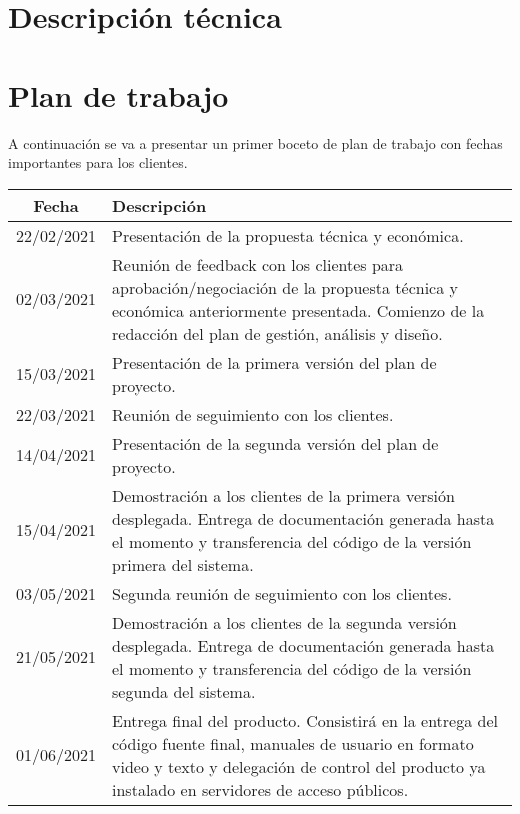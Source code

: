 \documentclass{article}
\begin{document}
\section{Descripción técnica}



\section{Plan de trabajo}
A continuación se va a presentar un primer boceto de plan de trabajo con fechas importantes para los clientes.

\begin{table}[H]
    \centering
    \begin{tabular}{| c | p{30em} |}
    \hline
        Fecha &  Descripción  \\ \hline
        22/02/2021 & Presentación de la propuesta técnica y económica.  \\ \hline
        02/03/2021 & Reunión de feedback con los clientes para aprobación/negociación de la propuesta técnica y económica anteriormente presentada. Comienzo de la redacción del plan de gestión, análisis y diseño. \\ \hline
        15/03/2021 & Presentación de la primera versión del plan de proyecto.\\ \hline
        22/03/2021 & Reunión de seguimiento con los clientes. \\ \hline
        14/04/2021 & Presentación de la segunda versión del plan de proyecto. \\ \hline
        15/04/2021 & Demostración a los clientes de la primera versión desplegada.
        Entrega de documentación generada hasta el momento y transferencia del código de la versión primera del sistema.\\ \hline
        03/05/2021 & Segunda reunión de seguimiento con los clientes. \\ \hline
        21/05/2021 & Demostración a los clientes de la segunda versión desplegada.
        Entrega de documentación generada hasta el momento y transferencia del código de la versión segunda del sistema.\\ \hline
        01/06/2021 & Entrega final del producto. Consistirá en la entrega del código fuente final, manuales de usuario en formato video y texto y delegación de control del producto ya instalado en servidores de acceso públicos.\\ \hline
    \end{tabular}
\end{table}
\end{document}
